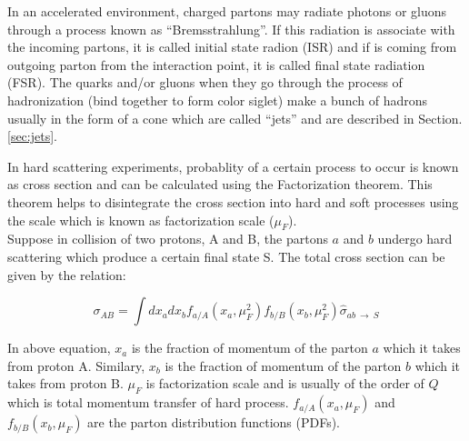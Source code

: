 In an accelerated environment, charged partons may radiate photons or gluons through a process known as ``Bremsstrahlung''. If this radiation is associate with the incoming partons, it is called initial state radion (ISR) and if is coming from outgoing parton from the interaction point, it is called final state radiation (FSR).
The quarks and/or gluons when they go through the process of hadronization (bind together to form color siglet) make a bunch of hadrons usually in the form of a cone which are called ``jets'' and are described in Section. \ref{sec:jets}. %
\par In hard scattering  experiments, probablity of a certain process to occur is known as cross section and can be calculated using the Factorization theorem.
This theorem helps to disintegrate the cross section into hard and soft processes using the scale which is known as factorization scale ($\mu_{F}$).\\
Suppose in collision of two protons, A and B, the partons $a$ and $b$ undergo hard scattering which produce a certain final state S. The total cross section can be given by the relation:

\begin{equation}
	\sigma_{AB}=\int dx_{a} dx_{b}f_{a/A}(x_{a},\mu^{2}_{F}) f_{b/B}(x_{b},\mu^{2}_{F}) \hat{\sigma}_{ab~\to~S}           %
        \label{prod_XS}
\end{equation}

In above equation, $x_{a}$ is the fraction of momentum of the parton $a $ which it takes from proton A. Similary, 
$x_{b}$ is the fraction of momentum of the parton $b $ which it takes from proton B.
$\mu_{F}$ is factorization scale and is usually of the order of $Q$ which is total momentum transfer of hard process.
$f_{a/A}(x_{a},\mu_{F})$  and~ $f_{b/B}(x_{b},\mu_{F}) $  are the parton distribution functions (PDFs).












